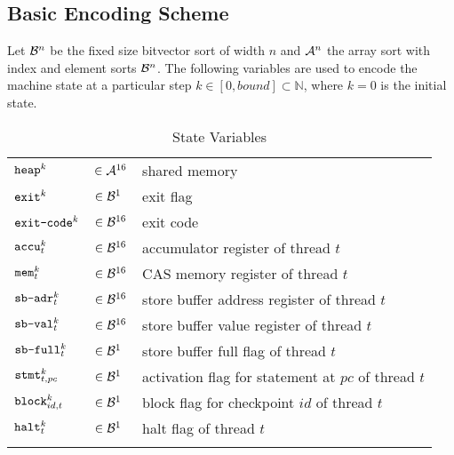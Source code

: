 \subsection{Basic Encoding Scheme}

Let $\BVSORT[n]$ be the fixed size bitvector sort of width $n$ and $\ASORT[n]$ the array sort with index and element sorts $\BVSORT[n]$.
The following variables are used to encode the machine state at a particular step $k \in [0, bound] \subset \mathbb{N}$, where $k = 0$ is the initial state.

\setlength{\tabulinesep}{3pt}
\begin{longtabu}{llX}
  \firsthline
  $\HEAP^k$ & $\in \ASORT$ & shared memory \\
  $\EXIT^k$ & $\in \BVSORT[1]$ & exit flag \\
  $\EXITCODE^k$ & $\in \BVSORT$ & exit code \\
  \hline
  $\ACCU^k_t$ & $\in \BVSORT$ & accumulator register of thread $t$ \\
  $\MEM^k_t$ & $\in \BVSORT$ & CAS memory register of thread $t$ \\
  $\SBADR^k_t$ & $\in \BVSORT$ & store buffer address register of thread $t$ \\
  $\SBVAL^k_t$ & $\in \BVSORT$ & store buffer value register of thread $t$ \\
  $\SBFULL^k_t$ & $\in \BVSORT[1]$ & store buffer full flag of thread $t$ \\
  $\STMT^k_{t, pc}$ & $\in \BVSORT[1]$ & activation flag for statement at $pc$ of thread $t$ \\
  $\BLOCK^k_{id, t}$ & $\in \BVSORT[1]$ & block flag for checkpoint $id$ of thread $t$ \\
  $\HALT^k_t$ & $\in \BVSORT[1]$ & halt flag of thread $t$ \\
  \lasthline
  \caption{State Variables}
  \label{tbl:states}
\end{longtabu}

\newcommand{\READ}{\texttt{read}}
\newcommand{\WRITE}{\texttt{write}}

